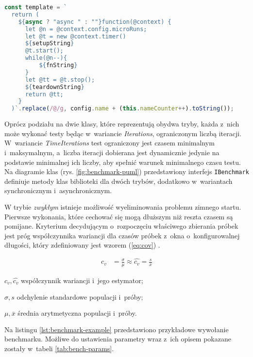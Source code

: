\begin{lstlisting}[language=JavaScript, label=lst:benchmark-fn, caption=Kompozycja funkcji w~trybie \textit{extracted}.]
const template = `
  return (
    ${async ? "async " : ""}function(@context) {
      let @n = @context.config.microRuns;
      let @t = new @context.timer()
      ${setupString}
      @t.start();
      while(@n--){
          ${fnString}
      }
      let @tt = @t.stop();
      ${teardownString}
      return @tt;
    }
  )`.replace(/@/g, config.name + (this.nameCounter++).toString());
\end{lstlisting}

Oprócz podziału na dwie klasy, które reprezentują obydwa tryby, każda z~nich może wykonać testy będąc w~wariancie \textit{Iterations}, ograniczonym liczbą iteracji. W~wariancie \textit{TimeIterations} test ograniczony jest czasem minimalnym i~maksymalnym, a~liczba iteracji dobierana jest dynamicznie jedynie na podstawie minimalnej ich liczby, aby spełnić warunek minimalnego czasu testu. Na diagramie klas (rys. \ref{fig:benchmark-puml}) przedstawiony interfejs \lstinline{IBenchmark} definiuje metody klas biblioteki dla dwóch trybów, dodatkowo w~wariantach synchronicznym i~asynchronicznym.

W trybie \textit{zwykłym} istnieje możliwość wyeliminowania problemu zimnego startu. Pierwsze wykonania, które cechować się mogą dłuższym niż reszta czasem są pomijane. Kryterium decydującym o~rozpoczęciu właściwego zbierania próbek jest próg współczynnika wariancji dla czasów próbek z~okna o~konfigurowalnej długości, który zdefiniowany jest wzorem (\ref{eq:cov}) \cite{georges2007statistically}.

\begin{align}
 c_v &= \frac{\sigma}{\mu} \approx \widehat{c_v} = \frac{s}{\overline{x}} \label{eq:cov}
\end{align}
\begin{eqexpl}[1cm]
  \item{$c_v, \widehat{c_v}$} współczynnik wariancji i~jego estymator;
  \item{$\sigma, s$} odchylenie standardowe populacji i~próby;
  \item{$\mu, \overline{x}$} średnia arytmetyczna populacji i~próby.
\end{eqexpl}
\vspace{0.5cm}
Na listingu \ref{lst:benchmark-example} przedstawiono przykładowe wywołanie benchmarku. Możliwe do ustawienia parametry wraz z~ich opisem pokazane zostały w~tabeli \ref{tab:bench-params}.

